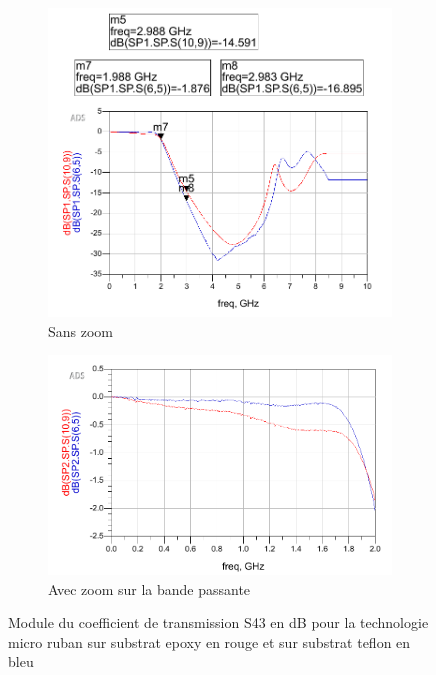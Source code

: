\documentclass[french]{article}
\begin{document}
\begin{figure}[H]
	\centering
	\begin{subfigure}[b]{0.49\textwidth}
		\includegraphics[width=\textwidth]{photo/passe_bas_vic/simu_passe_bas_reel_tche.PNG}
		\caption{Sans zoom}
		\label{fig:simu_passe_bas_reel_tcheG}
	\end{subfigure}
	\begin{subfigure}[b]{0.49\textwidth}
		\includegraphics[width=\textwidth]{photo/passe_bas_vic/simu_zoom_passe_bas_reel_tche.PNG}
		\caption{Avec zoom sur la bande passante}
		\label{fig:simu_zoom_passe_bas_reel_tche}
	\end{subfigure}
	\caption{Module du coefficient de transmission S43 en dB pour la technologie micro ruban sur substrat epoxy en rouge et sur substrat teflon en bleu}
		\label{fig:simu_passe_bas_reel_tche}
\end{figure}
\end{document}
